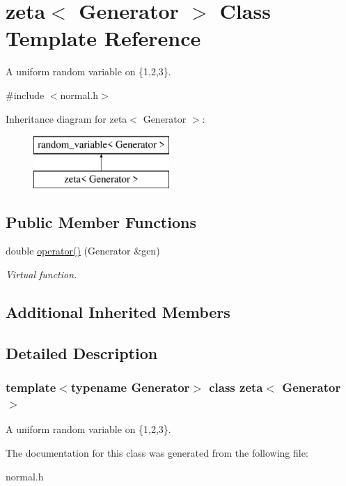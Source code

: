 \hypertarget{classzeta}{}\section{zeta$<$ Generator $>$ Class Template Reference}
\label{classzeta}


A uniform random variable on \{1,2,3\}.  




{\ttfamily \#include $<$normal.\+h$>$}

Inheritance diagram for zeta$<$ Generator $>$\+:\begin{figure}[H]
\begin{center}
\leavevmode
\includegraphics[height=2.000000cm]{classzeta}
\end{center}
\end{figure}
\subsection*{Public Member Functions}
\begin{DoxyCompactItemize}
\item 
\mbox{\label{classzeta_ad4df70f32566a510f6e4201f722df570}} 
double \mbox{\hyperlink{classzeta_ad4df70f32566a510f6e4201f722df570}{operator()}} (Generator \&gen)
\begin{DoxyCompactList}\small\item\em Virtual function. \end{DoxyCompactList}\end{DoxyCompactItemize}
\subsection*{Additional Inherited Members}


\subsection{Detailed Description}
\subsubsection*{template$<$typename Generator$>$\newline
class zeta$<$ Generator $>$}

A uniform random variable on \{1,2,3\}. 

The documentation for this class was generated from the following file\+:\begin{DoxyCompactItemize}
\item 
normal.\+h\end{DoxyCompactItemize}
